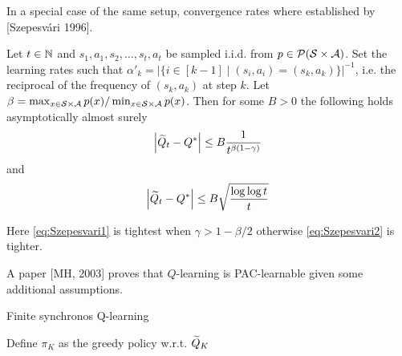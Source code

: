 In a special case of the same setup, convergence rates where
established by [Szepesvári 1996]. %
\begin{thm}[Szepesvári]
  Let $t \in \mathbb{N}$ and
  $s_1, a_1, s_2, \dots, s_t, a_t$ be sampled i.i.d. from
  $p \in \mathcal{P}(\mathcal{S} \times \mathcal{A})$.
  Set the learning rates such that
  $\alpha'_k
  = |\{ i \in [k-1] \mid (s_i, a_i) = (s_k, a_k) \}|^{-1}$,
  i.e. the reciprocal of the frequency of $(s_k, a_k)$ at step $k$.
  Let $\beta = \max_{x \in \mathcal{S} \times \mathcal{A}} p(x) /
  \min_{x \in \mathcal{S} \times \mathcal{A}} p(x)$.
  Then for some $B > 0$ the following holds asymptotically almost surely
  \begin{equation}
    \abs{\widetilde{Q}_t - Q^*} \leq B \frac{1}{t^{\beta (1-\gamma)}}
    \label{eq:Szepesvari1}
  \end{equation}
  and
  \begin{equation}
    \abs{\widetilde{Q}_t - Q^*} \leq B \sqrt{\frac{\log \log t}{t}}
    \label{eq:Szepesvari2}
  \end{equation}
\end{thm}
Here \cref{eq:Szepesvari1} is tightest when $\gamma > 1 - \beta/2$
otherwise \cref{eq:Szepesvari2} is tighter.

A paper [MH, 2003] proves that $Q$-learning is PAC-learnable
given some additional assumptions.

\begin{algorithm}[H] %
  \caption{Finite synchronos Q-learning}

  Define $\pi_K$ as the greedy policy w.r.t. $\widetilde{Q}_K$ \\
  \label{alg:finSyncQL}
\end{algorithm}


